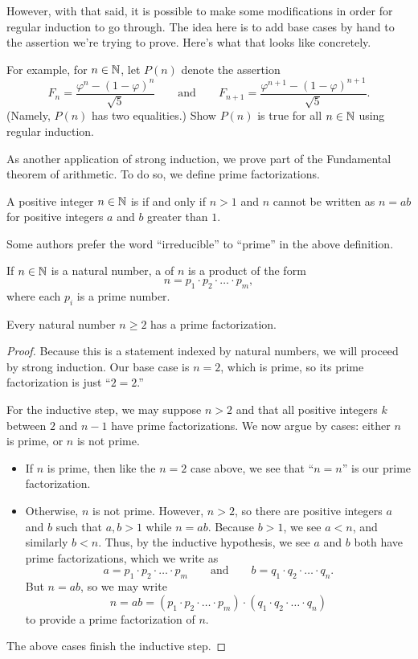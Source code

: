 \documentclass[../notes.tex]{subfiles}
\begin{document}
However, with that said, it is possible to make some modifications in order for regular induction to go through. The idea here is to add base cases by hand to the assertion we're trying to prove. Here's what that looks like concretely.
\begin{exe} \label{exe:binet-regular-induction}
    For example, for $n\in\mathbb N$, let $P(n)$ denote the assertion
    \[F_n=\frac{\varphi^n-(1-\varphi)^n}{\sqrt5}\qquad\text{and}\qquad F_{n+1}=\frac{\varphi^{n+1}-(1-\varphi)^{n+1}}{\sqrt5}.\]
    (Namely, $P(n)$ has two equalities.) Show $P(n)$ is true for all $n\in\mathbb N$ using regular induction.
\end{exe}
As another application of strong induction, we prove part of the Fundamental theorem of arithmetic. To do so, we define prime factorizations.
\begin{definition}[prime] 
    A positive integer $n\in\mathbb N$ is  if and only if $n>1$ and $n$ cannot be written as $n=ab$ for positive integers $a$ and $b$ greater than $1$.
\end{definition}
\begin{remark}
    Some authors prefer the word ``irreducible'' to ``prime'' in the above definition.
\end{remark}
\begin{definition}
    If $n \in \mathbb N$ is a natural number, a  of $n$ is a product of the form
    \[n = p_1\cdot p_2\cdot\ldots\cdot p_m,\]
    where each $p_i$ is a prime number.
\end{definition}
\begin{theorem}  \label{thm:fta}
    Every natural number $n \geq 2$ has a prime factorization.
\end{theorem}
\begin{proof}
    Because this is a statement indexed by natural numbers, we will proceed by strong induction. Our base case is $n=2$, which is prime, so its prime factorization is just ``$2=2$.''

    For the inductive step, we may suppose $n>2$ and that all positive integers $k$ between $2$ and $n-1$ have prime factorizations. We now argue by cases: either $n$ is prime, or $n$ is not prime.
    \begin{itemize}
        \item If $n$ is prime, then like the $n=2$ case above, we see that ``$n=n$'' is our prime factorization.
        \item Otherwise, $n$ is not prime. However, $n>2$, so there are positive integers $a$ and $b$ such that $a,b>1$ while $n = ab$. Because $b>1$, we see $a<n$, and similarly $b<n$. Thus, by the inductive hypothesis, we see $a$ and $b$ both have prime factorizations, which we write as
        \[a=p_1\cdot p_2\cdot\ldots\cdot p_m\qquad\text{and}\qquad b=q_1\cdot q_2\cdot\ldots\cdot q_n.\]
        But $n=ab$, so we may write
        \[n=ab=(p_1\cdot p_2\cdot\ldots\cdot p_m)\cdot(q_1\cdot q_2\cdot\ldots\cdot q_n)\]
        to provide a prime factorization of $n$.
    \end{itemize}
    The above cases finish the inductive step.
\end{proof}
\end{document}
